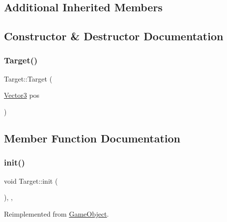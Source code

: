 \subsection*{Additional Inherited Members}


\subsection{Constructor \& Destructor Documentation}
\mbox{\label{class_target_ac423f1beea52507028b21180c3eadfd8}} 
\subsubsection{\texorpdfstring{Target()}{Target()}}
{\footnotesize\ttfamily Target\+::\+Target (\begin{DoxyParamCaption}\item[{\hyperlink{class_vector3}{Vector3}}]{pos }\end{DoxyParamCaption})\hspace{0.3cm}{\ttfamily [inline]}}



\subsection{Member Function Documentation}
\mbox{\label{class_target_aca691803b6bb7185adc521d63cdd7835}} 
\subsubsection{\texorpdfstring{init()}{init()}}
{\footnotesize\ttfamily void Target\+::init (\begin{DoxyParamCaption}{ }\end{DoxyParamCaption})\hspace{0.3cm}{\ttfamily [inline]}, {\ttfamily [override]}, {\ttfamily [virtual]}}



Reimplemented from \hyperlink{class_game_object_aecb2c1b9f69715d854f7604d5d7978ec}{Game\+Object}.

\mbox{\label{class_target_a03e4fae56bd104dadf5cec8247452c7e}} 
